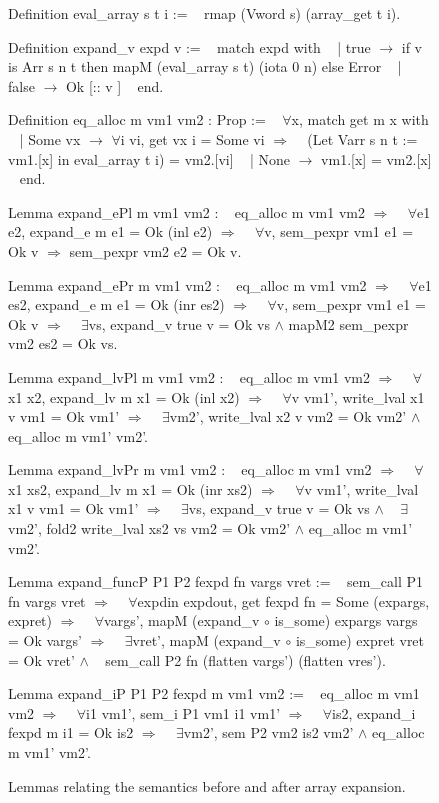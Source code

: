 \documentclass{article}
\begin{document}
\begin{figure}[p]
\obeylines\obeyspaces\ttfamily%
Definition eval\_array s t i :=
~ rmap (Vword s) (array\_get t i).

Definition expand\_v expd v :=
~ match expd with
~ | true  \(\rightarrow\) if v is Arr s n t then mapM (eval\_array s t) (iota 0 n) else Error
~ | false \(\rightarrow\) Ok [:: v ]
~ end.

Definition eq\_alloc m vm1 vm2 : Prop :=
~ \(\forall\)x, match get m x with
~ | Some vx \(\rightarrow\) \(\forall\)i vi, get vx i = Some vi \(\Longrightarrow\)
~   (Let Varr s n t := vm1.[x] in eval\_array t i) = vm2.[vi]
~ | None \(\rightarrow\) vm1.[x] = vm2.[x]
~ end.

Lemma expand\_ePl m vm1 vm2 :
~ eq\_alloc m vm1 vm2 \(\Longrightarrow\)
~ \(\forall\)e1 e2, expand\_e m e1 = Ok (inl e2) \(\Longrightarrow\)
~ \(\forall\)v, sem\_pexpr vm1 e1 = Ok v \(\Longrightarrow\) sem\_pexpr vm2 e2 = Ok v.

Lemma expand\_ePr m vm1 vm2 :
~ eq\_alloc m vm1 vm2 \(\Longrightarrow\)
~ \(\forall\)e1 es2, expand\_e m e1 = Ok (inr es2) \(\Longrightarrow\)
~ \(\forall\)v, sem\_pexpr vm1 e1 = Ok v \(\Longrightarrow\)
~ \(\exists\)vs, expand\_v true v = Ok vs \(\wedge\) mapM2 sem\_pexpr vm2 es2 = Ok vs.

Lemma expand\_lvPl m vm1 vm2 :
~ eq\_alloc m vm1 vm2 \(\Longrightarrow\)
~ \(\forall\)x1 x2, expand\_lv m x1 = Ok (inl x2) \(\Longrightarrow\)
~ \(\forall\)v vm1', write\_lval x1 v vm1 = Ok vm1' \(\Longrightarrow\)
~ \(\exists\)vm2', write\_lval x2 v vm2 = Ok vm2' \(\wedge\) eq\_alloc m vm1' vm2'.

Lemma expand\_lvPr m vm1 vm2 :
~ eq\_alloc m vm1 vm2 \(\Longrightarrow\)
~ \(\forall\)x1 xs2, expand\_lv m x1 = Ok (inr xs2) \(\Longrightarrow\)
~ \(\forall\)v vm1', write\_lval x1 v vm1 = Ok vm1' \(\Longrightarrow\)
~ \(\exists\)vs, expand\_v true v = Ok vs \(\wedge\)
~   \(\exists\)vm2', fold2 write\_lval xs2 vs vm2 = Ok vm2' \(\wedge\) eq\_alloc m vm1' vm2'.

Lemma expand\_funcP P1 P2 fexpd fn vargs vret :=
~ sem\_call P1 fn vargs vret \(\Longrightarrow\)
~ \(\forall\)expdin expdout, get fexpd fn = Some (expargs, expret) \(\Longrightarrow\)
~ \(\forall\)vargs', mapM (expand\_v \(\circ\) is\_some) expargs vargs = Ok vargs' \(\Longrightarrow\)
~ \(\exists\)vret',  mapM (expand\_v \(\circ\) is\_some) expret  vret  = Ok vret'  \(\wedge\)
~   sem\_call P2 fn (flatten vargs') (flatten vres').

Lemma expand\_iP P1 P2 fexpd m vm1 vm2 :=
~ eq\_alloc m vm1 vm2 \(\Longrightarrow\)
~ \(\forall\)i1 vm1', sem\_i P1 vm1 i1 vm1' \(\Longrightarrow\)
~ \(\forall\)is2, expand\_i fexpd m i1 = Ok is2 \(\Longrightarrow\)
~ \(\exists\)vm2', sem P2 vm2 is2 vm2' \(\wedge\) eq\_alloc m vm1' vm2'.
\normalfont%
\caption{Lemmas relating the semantics before and after array expansion.}
\end{figure}
\end{document}
